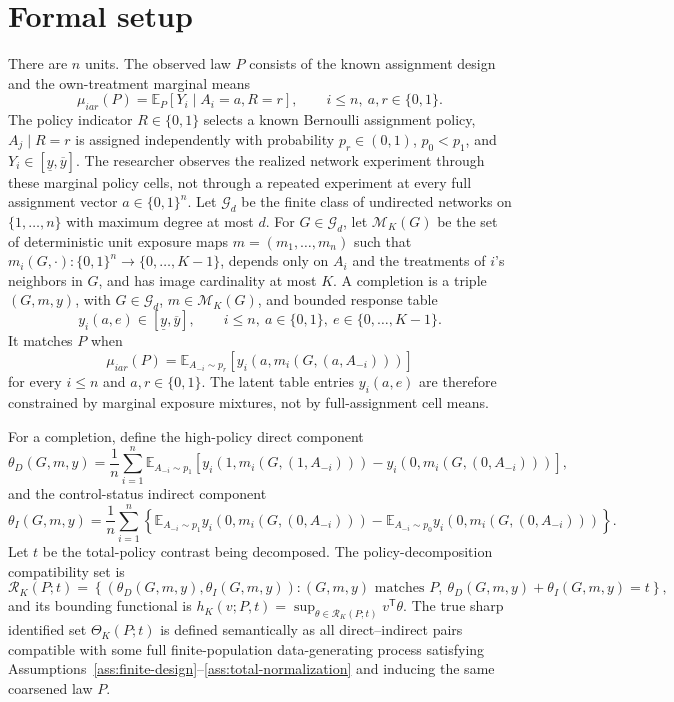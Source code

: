 \documentclass[11pt]{article}
\newcommand{\E}{\mathbb{E}}
\newcommand{\transpose}{\mathsf{T}}
\theoremstyle{definition}
\theoremstyle{plain}
\theoremstyle{remark}
\begin{document}
\section{Formal setup}
There are \(n\) units.  The observed law \(P\) consists of the known assignment
design and the own-treatment marginal means
\[
\mu_{iar}(P)=\E_P[Y_i\mid A_i=a,R=r],
\qquad i\le n,\ a,r\in\{0,1\}.
\]
The policy indicator \(R\in\{0,1\}\) selects a known Bernoulli assignment
policy, \(A_j\mid R=r\) is assigned independently with probability
\(p_r\in(0,1)\), \(p_0<p_1\), and \(Y_i\in[\underline y,\overline y]\).  The
researcher observes the realized network experiment through these marginal
policy cells, not through a repeated experiment at every full assignment vector
\(a\in\{0,1\}^n\).  Let \(\mathcal G_d\) be the finite class of undirected
networks on \(\{1,\ldots,n\}\) with maximum degree at most \(d\).
For \(G\in\mathcal G_d\), let \(\mathcal M_K(G)\) be the set of deterministic
unit exposure maps \(m=(m_1,\ldots,m_n)\) such that
\(m_i(G,\cdot):\{0,1\}^n\to\{0,\ldots,K-1\}\), depends only on \(A_i\) and the
treatments of \(i\)'s neighbors in \(G\), and has image cardinality at most
\(K\).  A completion is a triple \((G,m,y)\), with \(G\in\mathcal G_d\),
\(m\in\mathcal M_K(G)\), and bounded response table
\[
y_i(a,e)\in[\underline y,\overline y],\qquad
i\le n,\ a\in\{0,1\},\ e\in\{0,\ldots,K-1\}.
\]
It matches \(P\) when
\[
\mu_{iar}(P)=
\E_{A_{-i}\sim p_r}\!\left[y_i(a,m_i(G,(a,A_{-i})))\right]
\]
for every \(i\le n\) and \(a,r\in\{0,1\}\).  The latent table entries
\(y_i(a,e)\) are therefore constrained by marginal exposure mixtures, not by
full-assignment cell means.

For a completion, define the high-policy direct component
\[
\theta_D(G,m,y)=\frac1n\sum_{i=1}^n
\E_{A_{-i}\sim p_1}\!\left[
y_i(1,m_i(G,(1,A_{-i})))-y_i(0,m_i(G,(0,A_{-i})))
\right],
\]
and the control-status indirect component
\[
\theta_I(G,m,y)=\frac1n\sum_{i=1}^n
\left\{
\E_{A_{-i}\sim p_1}y_i(0,m_i(G,(0,A_{-i})))-
\E_{A_{-i}\sim p_0}y_i(0,m_i(G,(0,A_{-i})))
\right\}.
\]
Let \(t\) be the total-policy contrast being decomposed.  The
policy-decomposition compatibility set is
\[
\mathcal R_K(P;t)=
\left\{(\theta_D(G,m,y),\theta_I(G,m,y)):
(G,m,y)\text{ matches }P,\ \theta_D(G,m,y)+\theta_I(G,m,y)=t
\right\},
\]
and its bounding functional is \(h_K(v;P,t)=\sup_{\theta\in\mathcal R_K(P;t)}
v^\transpose\theta\).  The true sharp identified set \(\Theta_K(P;t)\) is
defined semantically as all direct--indirect pairs compatible with some full
finite-population data-generating process satisfying
Assumptions~\ref{ass:finite-design}--\ref{ass:total-normalization} and inducing
the same coarsened law \(P\).
\end{document}
